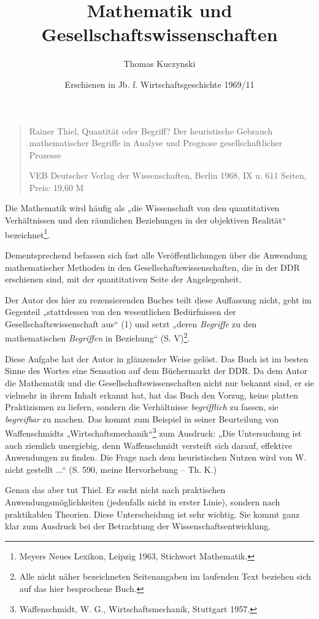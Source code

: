 ﻿\documentclass[11pt,a4paper]{article}
\title{Mathematik und Gesellschaftswissenschaften}
\author{Thomas Kuczynski}
\date{Erschienen in Jb. f. Wirtschaftsgeschichte 1969/11}
\begin{document}
\maketitle

\begin{quote}
  Rainer Thiel, Quantität oder Begriff? Der heuristische Gebrauch
  mathematischer Begriffe in Analyse und Prognose gesellschaftlicher Prozesse

  VEB Deutscher Verlag der Wissenschaften, Berlin 1968, IX u. 611 Seiten,
  Preis: 19,60 M
\end{quote}
Die Mathematik wird häufig als „die Wissenschaft von den quantitativen
Verhältnissen und den räumlichen Beziehungen in der objektiven Realität“
bezeichnet\footnote{Meyers Neues Lexikon, Leipzig 1963, Stichwort
  Mathematik.}.

Dementsprechend befassen sich fast alle Veröffentlichungen über die Anwendung
mathematischer Methoden in den Gesellschaftswissenschaften, die in der DDR
erschienen sind, mit der quantitativen Seite der Angelegenheit.

Der Autor des hier zu rezensierenden Buches teilt diese Auffassung nicht, geht
im Gegenteil „stattdessen von den wesentlichen Bedürfnissen der
Gesellschaftswissenschaft aus“ (1) und setzt „deren \emph{Begriffe} zu den
mathematischen \emph{Begriffen} in Beziehung“ (S. V)\footnote{Alle nicht näher
  bezeichneten Seitenangaben im laufenden Text beziehen sich auf das hier
  besprochene Buch.}.

Diese Aufgabe hat der Autor in glänzender Weise gelöst. Das Buch ist im besten
Sinne des Wortes eine Sensation auf dem Büchermarkt der DDR. Da dem Autor die
Mathematik und die Gesellschaftswissenschaften nicht nur bekannt sind, er sie
vielmehr in ihrem Inhalt erkannt hat, hat das Buch den Vorzug, keine platten
Praktizismen zu liefern, sondern die Verhältnisse \emph{begrifflich} zu
fassen, sie \emph{begreifbar} zu machen. Das kommt zum Beispiel in seiner
Beurteilung von Waffenschmidts „Wirtschaftsmechanik“\footnote{Waffenschmidt,
  W. G., Wirtschaftsmechanik, Stuttgart 1957.} zum Ausdruck: „Die Untersuchung
ist auch ziemlich unergiebig, denn Waffenschmidt versteift sich darauf,
effektive Anwendungen zu finden. Die Frage nach dem heuristischen Nutzen wird
von W. nicht gestellt ...“ (S. 590, meine Hervorhebung -- Th. K.)

Genau das aber tut Thiel. Er sucht nicht nach praktischen
Anwendungsmöglichkeiten (jedenfalls nicht in erster Linie), sondern nach
praktikablen Theorien. Diese Unterscheidung ist sehr wichtig. Sie kommt ganz
klar zum Ausdruck bei der Betrachtung der Wissenschaftsentwicklung.
\end{document}
